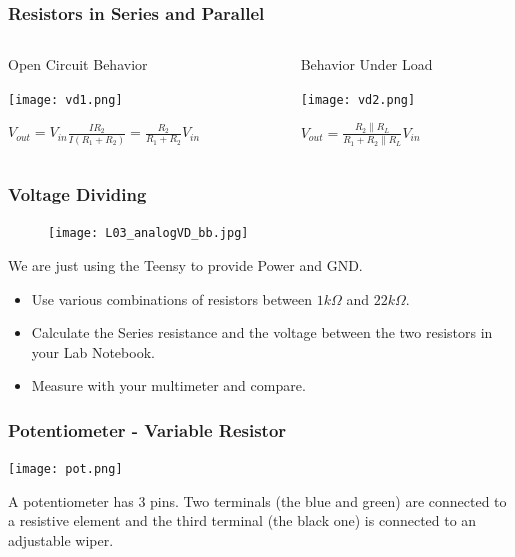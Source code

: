 \documentclass{beamer}
\begin{document}
\begin{frame}
\frametitle{Resistors in Series and Parallel}
\begin{columns}
\begin{column}{5.5cm}
\begin{center}
Open Circuit Behavior

\vspace{0.25cm}

\texttt{[image: vd1.png]}

\vspace{0.5cm}

$V_{out} = V_{in} \frac{I R_2}{I (R_1 + R_2)} = \frac{R_2}{R_1 + R_2} V_{in}$
\end{center}
\end{column}
\begin{column}{5cm}
\begin{center}
Behavior Under Load

\vspace{0.25cm}

\texttt{[image: vd2.png]}

\vspace{0.5cm}

$V_{out} =  \frac{R_2 \parallel R_L}{R_1 + R_2\parallel R_L} V_{in}$
\end{center}
\end{column}
\end{columns}
\end{frame}

\begin{frame}\frametitle{Voltage Dividing}
\begin{figure}[h]
	\texttt{[image: L03\_analogVD\_bb.jpg]}
\end{figure}
We are just using the Teensy to provide Power and GND.
\begin{itemize}
\item Use various combinations of resistors between $1k \Omega$ and $22k \Omega$.
\item Calculate the Series resistance and the voltage between the two resistors in your Lab Notebook.
\item Measure with your multimeter and compare.
\end{itemize}
\end{frame}

\begin{frame}\frametitle{Potentiometer - Variable Resistor}
\begin{center}
\texttt{[image: pot.png]}
\end{center}
A potentiometer has 3 pins. Two terminals (the blue and green) are connected to a resistive element and the third terminal (the black one) is connected to an adjustable wiper.
\end{frame}
\end{document}

